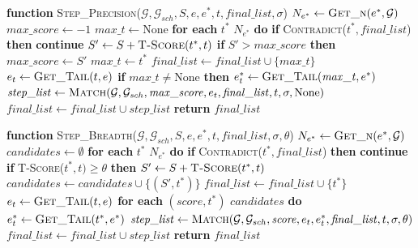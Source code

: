 \documentclass[11pt]{article}
\begin{document}
\begin{algorithm*}[t]
\caption{Subgraph Search Single Step Functions}
\label{alg:search_func}
\small
\begin{algorithmic}[1]

\State \textbf{function} \textsc{Step\_Precision}($\mathcal{G}, \mathcal{G}_{sch}, S, e, e^*, t, \mathit{final\_list}, \sigma$)
\State \quad $N_{e^*} \gets \textsc{Get\_n}(e^*, \mathcal{G})$
\State \quad $\mathit{max\_score} \gets -1$
\State \quad $\mathit{max\_t} \gets \text{None}$
\State \quad \textbf{for each} $t^*$  $N_{e^*}$ \textbf{do}
\State \quad \quad \textbf{if} \textsc{Contradict}($t^*, \mathit{final\_list}$) \textbf{then}
\State \quad \quad \quad \textbf{continue}
\State \quad \quad $S' \gets S + \textsc{T-Score}(t^*, t)$
\State \quad \quad \textbf{if} $S' > \mathit{max\_score}$ \textbf{then}
\State \quad \quad \quad $\mathit{max\_score} \gets S'$
\State \quad \quad \quad $\mathit{max\_t} \gets t^*$
\State \quad $\mathit{final\_list} \gets \mathit{final\_list} \cup \{\mathit{max\_t}\}$
\State \quad $e_t \gets \textsc{Get\_Tail}(t, e)$
\State \quad \textbf{if} $\mathit{max\_t} \neq \text{None}$ \textbf{then}
\State \quad \quad $e^*_t \gets \textsc{Get\_Tail}(\mathit{max\_t}, e^*)$
\State \quad \quad $\mathit{step\_list} \gets \textsc{Match}(\mathcal{G}, \mathcal{G}_{sch}, \mathit{max\_score}, e_t, \mathit{final\_list}, t, \sigma, \text{None})$
\State \quad \quad $\mathit{final\_list} \gets \mathit{final\_list} \cup \mathit{step\_list}$
\State \quad \textbf{return} $\mathit{final\_list}$

\Statex %

\State \textbf{function} \textsc{Step\_Breadth}($\mathcal{G}, \mathcal{G}_{sch}, S, e, e^*, t, \mathit{final\_list}, \sigma, \theta$)
\State \quad $N_{e^*} \gets \textsc{Get\_n}(e^*, \mathcal{G})$
\State \quad $\mathit{candidates} \gets \emptyset$
\State \quad \textbf{for each} $t^*$  $N_{e^*}$ \textbf{do}
\State \quad \quad \textbf{if} \textsc{Contradict}($t^*, \mathit{final\_list}$) \textbf{then}
\State \quad \quad \quad \textbf{continue}
\State \quad \quad \textbf{if} \textsc{T-Score}($t^*, t) \geq \theta$ \textbf{then}
\State \quad \quad \quad $S' \gets S + \textsc{T-Score}(t^*, t)$
\State \quad \quad \quad $\mathit{candidates} \gets \mathit{candidates} \cup \{(S', t^*)\}$
\State \quad \quad \quad $\mathit{final\_list} \gets \mathit{final\_list} \cup \{t^*\}$
\State \quad $e_t \gets \textsc{Get\_Tail}(t, e)$
\State \quad \textbf{for each} $(\mathit{score}, t^*)$  $\mathit{candidates}$ \textbf{do}
\State \quad \quad $e^*_t \gets \textsc{Get\_Tail}(t^*, e^*)$
\State \quad \quad $\mathit{step\_list} \gets \textsc{Match}(\mathcal{G}, \mathcal{G}_{sch}, \mathit{score}, e_t, e^*_t,\mathit{final\_list}, t, \sigma, \theta)$
\State \quad \quad $\mathit{final\_list} \gets \mathit{final\_list} \cup \mathit{step\_list}$
\State \quad \textbf{return} $\mathit{final\_list}$

\end{algorithmic}
\end{algorithm*}
\end{document}
